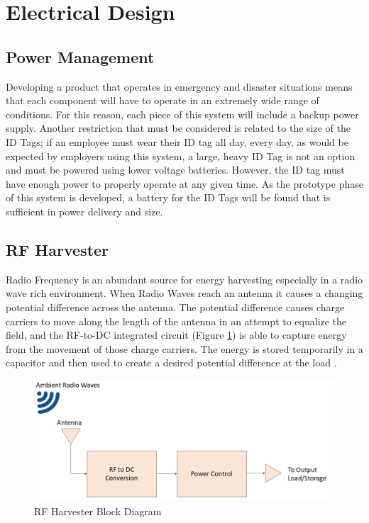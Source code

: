 

\setcounter{section}{4}
\section{Electrical Design}
\bigskip

\subsection{Power Management}
\medskip
Developing a product that operates in emergency and disaster situations means that each component will have to operate in an extremely wide range of conditions. For this reason, each piece of this system will include a backup power supply. Another restriction that must be considered is related to the size of the ID Tags; if an employee must wear their ID tag all day, every day, as would be expected by employers using this system, a large, heavy ID Tag is not an option and must be powered using lower voltage batteries. However, the ID tag must have enough power to properly operate at any given time. As the prototype phase of this system is developed, a battery for the ID Tags will be found that is sufficient in power delivery and size.

\pagebreak
\subsection{RF Harvester}
\medskip
Radio Frequency is an abundant source for energy harvesting especially in a radio wave rich environment. When Radio Waves reach an antenna it causes a changing potential difference across the antenna. The potential difference causes charge carriers to move along the length of the antenna in an attempt to equalize the field, and the RF-to-DC integrated circuit (Figure \ref{rf_bd}) is able to capture energy from the movement of those charge carriers. The energy is stored temporarily in a capacitor and then used to create a desired potential difference at the load \cite{R5-2-1}.

\medskip
\begin{figure}[H]
\centering
    \includegraphics[scale=0.55]{./images/RF_H.png}
    \caption{RF Harvester Block Diagram}
    \label{rf_bd}
\end{figure}

